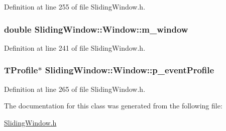 Definition at line 255 of file Sliding\+Window.\+h.

\subsubsection[{\texorpdfstring{m\+\_\+window}{m_window}}]{\setlength{\rightskip}{0pt plus 5cm}double Sliding\+Window\+::\+Window\+::m\+\_\+window\hspace{0.3cm}{\ttfamily [protected]}}\hypertarget{classSlidingWindow_1_1Window_a29f03954035661fea490d9442e730f47}{}\label{classSlidingWindow_1_1Window_a29f03954035661fea490d9442e730f47}


Definition at line 241 of file Sliding\+Window.\+h.

\subsubsection[{\texorpdfstring{p\+\_\+event\+Profile}{p_eventProfile}}]{\setlength{\rightskip}{0pt plus 5cm}T\+Profile$\ast$ Sliding\+Window\+::\+Window\+::p\+\_\+event\+Profile\hspace{0.3cm}{\ttfamily [protected]}}\hypertarget{classSlidingWindow_1_1Window_abd3e78a58ed38aaefef14afd2a27e448}{}\label{classSlidingWindow_1_1Window_abd3e78a58ed38aaefef14afd2a27e448}


Definition at line 265 of file Sliding\+Window.\+h.



The documentation for this class was generated from the following file\+:\begin{DoxyCompactItemize}
\item 
\hyperlink{SlidingWindow_8h}{Sliding\+Window.\+h}\end{DoxyCompactItemize}
